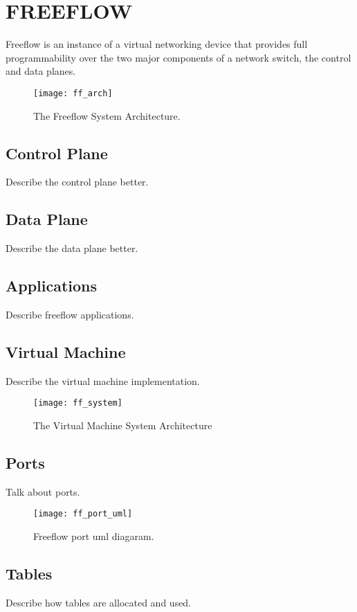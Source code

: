 \chapter{FREEFLOW}
\label{ff}
Freeflow is an instance of a virtual networking device that provides full programmability over the two major components of a network switch, the control and data planes. 

\begin{figure}[h]
\centering
\texttt{[image: ff\_arch]}
\caption{The Freeflow System Architecture.}
\label{ff_arch}
\end{figure}

\section{Control Plane}
\label{ff:cp}
Describe the control plane better.

\section{Data Plane}
\label{ff:dp}
Describe the data plane better.

\section{Applications}
\label{ff:app}
Describe freeflow applications.

\section{Virtual Machine}
\label{vm}
Describe the virtual machine implementation.

\begin{figure}[h]
\centering
\texttt{[image: ff\_system]}
\caption{The Virtual Machine System Architecture}
\label{fig:ff_system}
\end{figure}

\section{Ports}
\label{vm:port}
Talk about ports.

\begin{figure}[h]
\centering
\texttt{[image: ff\_port\_uml]}
\caption{Freeflow port uml diagaram.}
\label{port_uml}
\end{figure}

\section{Tables}
\label{vm:tables}
Describe how tables are allocated and used.

